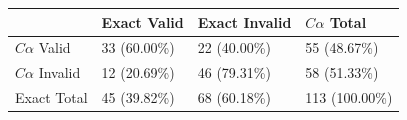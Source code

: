 \begin{tabular}{llll}
\toprule
 & Exact Valid & Exact Invalid & $C\alpha$ Total \\
\midrule
$C\alpha$ Valid & 33 (60.00\%) & 22 (40.00\%) & 55 (48.67\%) \\
$C\alpha$ Invalid & 12 (20.69\%) & 46 (79.31\%) & 58 (51.33\%) \\
Exact Total & 45 (39.82\%) & 68 (60.18\%) & 113 (100.00\%) \\
\bottomrule
\end{tabular}
